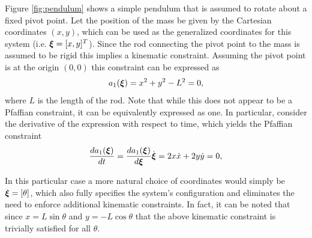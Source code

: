 \begin{example}[Pendulum] \label{ex:pendulum}
\theoremstyle{definition}
Figure \ref{fig:pendulum} shows a simple pendulum that is assumed to rotate about a fixed pivot point. Let the position of the mass be given by the Cartesian coordinates $(x,y)$, which can be used as the generalized coordinates for this system (i.e. $\bm{\xi} = [x, y]^T$). Since the rod connecting the pivot point to the mass is assumed to be rigid this implies a kinematic constraint. Assuming the pivot point is at the origin $(0,0)$ this constraint can be expressed as
\begin{equation} \label{eq:pendholonomic}
a_1(\bm{\xi}) = x^2 + y^2 - L^2 = 0,    
\end{equation}
where $L$ is the length of the rod. Note that while this does not appear to be a Pfaffian constraint, it can be equivalently expressed as one. In particular, consider the derivative of the expression with respect to time, which yields the Pfaffian constraint
\begin{equation} \label{eq:pendpfaffian}
\frac{d a_1(\bm{\xi})}{dt} = \frac{d a_1(\bm{\xi})}{d\bm{\xi}}\dot{\bm{\xi}} = 2x\dot{x} + 2y\dot{y} = 0,
\end{equation}

In this particular case a more natural choice of coordinates would simply be $\bm{\xi} = [\theta]$, which also fully specifies the system's configuration and eliminates the need to enforce additional kinematic constraints. In fact, it can be noted that since $x = L\sin \theta$ and $y = -L \cos \theta$ that the above kinematic constraint is trivially satisfied for all $\theta$.
\end{example}

